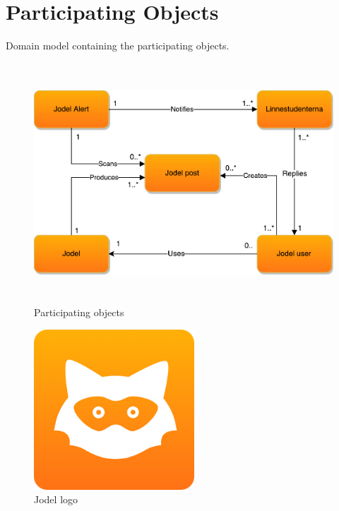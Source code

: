 \documentclass[a4paper,12pt]{article}
\begin{document}
\section{Participating Objects}
Domain model containing the participating objects.\\

\begin{figure}[!h]
	\centering
	\includegraphics[height=9cm]{img/ParticipatingObjects.pdf}
	\caption{Participating objects}
	\label{Participating objects}
\end{figure}
\begin{figure}[!h]
	\centering
	\includegraphics[height=6cm]{img/jodel.png}
	\caption{Jodel logo}
	\label{Jodel}
\end{figure}
\end{document}
